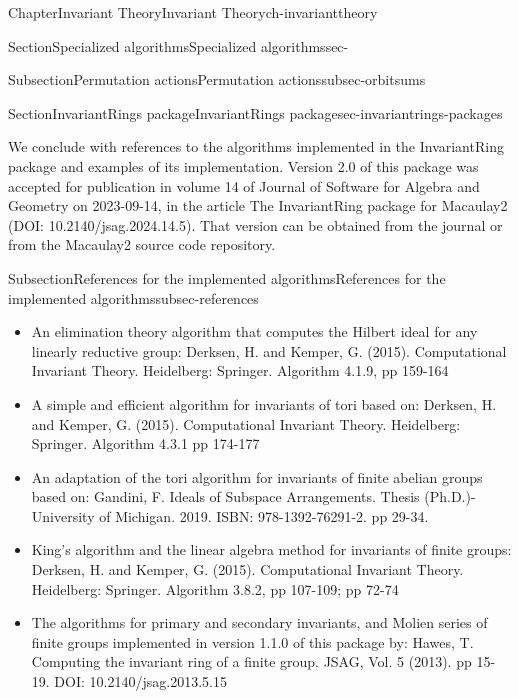 \documentclass[oneside,10pt,]{book}
\begin{document}
\begin{chapterptx}{Chapter}{Invariant Theory}{}{Invariant Theory}{}{}{ch-invarianttheory}
\begin{sectionptx}{Section}{Specialized algorithms}{}{Specialized algorithms}{}{}{sec-}
\begin{subsectionptx}{Subsection}{Permutation actions}{}{Permutation actions}{}{}{subsec-orbitsums}
\end{subsectionptx}
\end{sectionptx}
%
%
\typeout{************************************************}
\typeout{************************************************}
%
\begin{sectionptx}{Section}{InvariantRings package}{}{InvariantRings package}{}{}{sec-invariantrings-packages}
\begin{introduction}{}%
We conclude with references to the algorithms implemented in the InvariantRing package and examples of its implementation. Version 2.0 of this package was accepted for publication in volume 14 of Journal of Software for Algebra and Geometry on 2023-09-14, in the article The InvariantRing package for Macaulay2 (DOI: 10.2140\slash{}jsag.2024.14.5). That version can be obtained from the journal or from the Macaulay2 source code repository.%
\end{introduction}%
%
%
\typeout{************************************************}
\typeout{************************************************}
%
\begin{subsectionptx}{Subsection}{References for the implemented algorithms}{}{References for the implemented algorithms}{}{}{subsec-references}
%
\begin{itemize}[label=\textbullet]
\item{}An elimination theory algorithm that computes the Hilbert ideal for any linearly reductive group: Derksen, H. and Kemper, G. (2015). Computational Invariant Theory. Heidelberg: Springer. Algorithm 4.1.9, pp 159-164%
\item{}A simple and efficient algorithm for invariants of tori based on: Derksen, H. and Kemper, G. (2015). Computational Invariant Theory. Heidelberg: Springer. Algorithm 4.3.1 pp 174-177%
\item{}An adaptation of the tori algorithm for invariants of finite abelian groups based on: Gandini, F. Ideals of Subspace Arrangements. Thesis (Ph.D.)-University of Michigan. 2019. ISBN: 978-1392-76291-2. pp 29-34.%
\item{}King's algorithm and the linear algebra method for invariants of finite groups: Derksen, H. and Kemper, G. (2015). Computational Invariant Theory. Heidelberg: Springer. Algorithm 3.8.2, pp 107-109; pp 72-74%
\item{}The algorithms for primary and secondary invariants, and Molien series of finite groups implemented in version 1.1.0 of this package by: Hawes, T. Computing the invariant ring of a finite group. JSAG, Vol. 5 (2013). pp 15-19. DOI: 10.2140\slash{}jsag.2013.5.15%

\end{itemize}
\end{subsectionptx}
\end{sectionptx}
\end{chapterptx}
\end{document}
